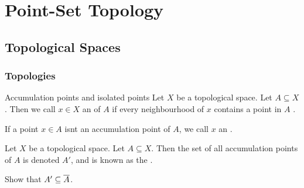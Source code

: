 \part{Point-Set Topology}
\parttoc
\chapter{Topological Spaces}
\section{Topologies}
\begin{importantdefinition}{Accumulation points and isolated points}{}
	Let $X$ be a topological space. Let $A \subseteq X$. Then we call $x \in X$ an  of $A$ if every neighbourhood of $x$ contains a point in $A$ . 
	
	If a point $x \in A$ isnt an accumulation point of $A$, we call $x$ an .
\end{importantdefinition}
\begin{definition}
	Let $X$ be a topological space. Let $A \subseteq X$. Then the set of all accumulation points of $A$ is denoted $A'$, and is known as the .
\end{definition}
\begin{exercise}
	Show that $A' \subseteq \overline{{A}}$.
\end{exercise}

\clearpage

